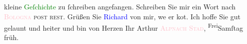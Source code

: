                     kleine \textcolor{green}{Geſchichte}{} zu
                    ſchreiben angefangen. Schreiben Sie mir ein Wort nach \textsc{\textcolor{pink}{Bologna}{}\ledrightnote{\textcolor{pink}{Bologna}} post rest}. Grüßen Sie \textcolor{blue}{Richard}{}\ledrightnote{\textcolor{blue}{Richard Beer-Hofmann}} von mir, we{\geminationn} er ko{\geminationm}t. Ich hoffe
                    Sie gut gelaunt und heiter und bin von Herzen \pend
           \pstart Ihr \spacefill\mbox{Arthur}\pend{}\pstart
           \textcolor{pink}{\textsc{Alpnach Stad}}{}\ledrightnote{\textcolor{pink}{Alpnachstad}}, \substVorne{}\textsuperscript{Frei}\substDazwischen{}Samſ\substHinten{}tag{ }früh.\pend
           \endnumbering{}  
      